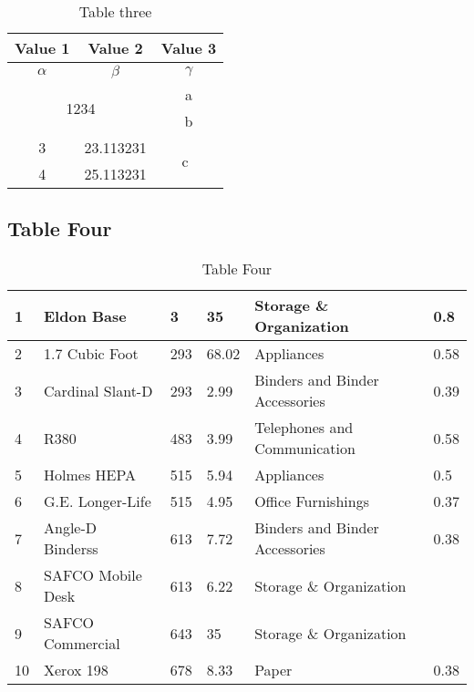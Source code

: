 \begin{table}[h]
  \centering
  \label{tab:table3}
  \begin{tabular}{|c|c|c|}
    \hline
    \textbf{Value 1}                            & \textbf{Value 2} & \textbf{Value 3}    \\
    \hline
    $\alpha$                                    & $\beta$          & $\gamma$            \\
    \hline
    \multicolumn{2}{|c|}{\multirow{2}{*}{1234}} & a                                      \\
    \cline{3-3}
    \multicolumn{2}{|c|}{}                      & b                                      \\
    \hline
    3                                           & 23.113231        & \multirow{2}{*}{c~} \\
    \cline{1-2}
    4                                           & 25.113231        &                     \\
    \hline
  \end{tabular}
  \caption{Table three}
\end{table}

\subsection{Table Four}
\begin{table}[!ht]
  \centering
  \begin{tabular}{|l|l|l|l|l|l|}
    \hline
    1  & Eldon Base        & 3   & 35    & Storage \& Organization        & 0.8  \\ \hline
    2  & 1.7 Cubic Foot    & 293 & 68.02 & Appliances                     & 0.58 \\ \hline
    3  & Cardinal Slant-D  & 293 & 2.99  & Binders and Binder Accessories & 0.39 \\ \hline
    4  & R380              & 483 & 3.99  & Telephones and Communication   & 0.58 \\ \hline
    5  & Holmes HEPA       & 515 & 5.94  & Appliances                     & 0.5  \\ \hline
    6  & G.E. Longer-Life  & 515 & 4.95  & Office Furnishings             & 0.37 \\ \hline
    7  & Angle-D Binderss  & 613 & 7.72  & Binders and Binder Accessories & 0.38 \\ \hline
    8  & SAFCO Mobile Desk & 613 & 6.22  & Storage \& Organization        & ~    \\ \hline
    9  & SAFCO Commercial  & 643 & 35    & Storage \& Organization        & ~    \\ \hline
    10 & Xerox 198         & 678 & 8.33  & Paper                          & 0.38 \\ \hline
  \end{tabular}
  \caption{Table Four}
  \label{Table Four}
\end{table}